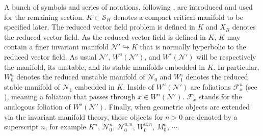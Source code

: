 \documentclass[usletter,11pt]{article}
\theoremstyle{remark}
\begin{document}
A bunch of symbols and series of notations, following \cite{Sz1991}, are introduced and used for the remaining section. 
$K\subset\mathcal{S}_H$ denotes a compact critical manifold to be specified later. The reduced vector field problem is defined in $K$ and $X_R$ denotes the reduced vector field. As the reduced vector field is defined in $K$, $K$ may contain a finer invariant manifold $\mathcal{N}' \hookrightarrow K$ that is normally hyperbolic to the reduced vector field. 
As usual $\mathcal{N'}$, $W^u(\mathcal{N}')$, and $W^s(\mathcal{N}')$ will be respectively the manifold, its unstable, and its stable manifolds embedded in $K$. In particular, $W_0^u$ denotes the reduced unstable manifold of $\mathcal{N}_0$ and $W_1^s$ denotes the reduced stable manifold of $\mathcal{N}_1$ embedded in $K$. Inside of $W^u(\mathcal{N}')$ are foliations $\mathcal{F}^u_x$ (see \cite[Theorem 12.2]{fenichel_geometric_1979}), meaning a foliation that passes  through $x\in W^u(\mathcal{N}')$. 
$\mathcal{F}^s_x$ stands for the analogous foliation of  $W^s(\mathcal{N}')$. 
Finally, when geometric objects are extended via the invariant manifold theory,  those objects for $n>0$  are denoted by a superscript $n$, for example $K^n$, $\mathcal{N}_0^n$, $\mathcal{N}_0^{u,n}$, $W_0^{u,n}$, $M_0^n$, $\cdots$. 
\end{document}
